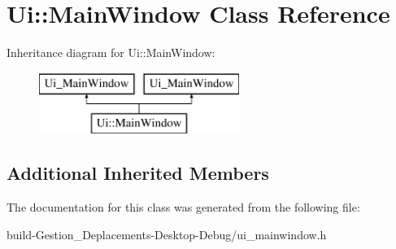 \section{Ui\-:\-:Main\-Window Class Reference}
\label{class_ui_1_1_main_window}
Inheritance diagram for Ui\-:\-:Main\-Window\-:\begin{figure}[H]
\begin{center}
\leavevmode
\includegraphics[height=2.000000cm]{class_ui_1_1_main_window}
\end{center}
\end{figure}
\subsection*{Additional Inherited Members}


The documentation for this class was generated from the following file\-:\begin{DoxyCompactItemize}
\item 
build-\/\-Gestion\-\_\-\-Deplacements-\/\-Desktop-\/\-Debug/ui\-\_\-mainwindow.\-h\end{DoxyCompactItemize}
